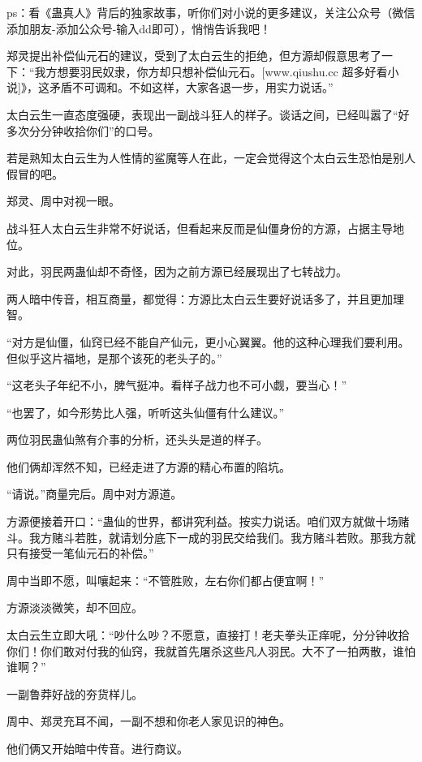 
\begin{this_body}

ps：看《蛊真人》背后的独家故事，听你们对小说的更多建议，关注公众号（微信添加朋友-添加公众号-输入dd即可），悄悄告诉我吧！

郑灵提出补偿仙元石的建议，受到了太白云生的拒绝，但方源却假意思考了一下：“我方想要羽民奴隶，你方却只想补偿仙元石。[www.qiushu.cc 超多好看小说]》，这矛盾不可调和。不如这样，大家各退一步，用实力说话。”

太白云生一直态度强硬，表现出一副战斗狂人的样子。谈话之间，已经叫嚣了“好多次分分钟收拾你们”的口号。

若是熟知太白云生为人性情的鲨魔等人在此，一定会觉得这个太白云生恐怕是别人假冒的吧。

郑灵、周中对视一眼。

战斗狂人太白云生非常不好说话，但看起来反而是仙僵身份的方源，占据主导地位。

对此，羽民两蛊仙却不奇怪，因为之前方源已经展现出了七转战力。

两人暗中传音，相互商量，都觉得：方源比太白云生要好说话多了，并且更加理智。

“对方是仙僵，仙窍已经不能自产仙元，更小心翼翼。他的这种心理我们要利用。但似乎这片福地，是那个该死的老头子的。”

“这老头子年纪不小，脾气挺冲。看样子战力也不可小觑，要当心！”

“也罢了，如今形势比人强，听听这头仙僵有什么建议。”

两位羽民蛊仙煞有介事的分析，还头头是道的样子。

他们俩却浑然不知，已经走进了方源的精心布置的陷坑。

“请说。”商量完后。周中对方源道。

方源便接着开口：“蛊仙的世界，都讲究利益。按实力说话。咱们双方就做十场赌斗。我方赌斗若胜，就请划分底下一成的羽民交给我们。我方赌斗若败。那我方就只有接受一笔仙元石的补偿。”

周中当即不愿，叫嚷起来：“不管胜败，左右你们都占便宜啊！”

方源淡淡微笑，却不回应。

太白云生立即大吼：“吵什么吵？不愿意，直接打！老夫拳头正痒呢，分分钟收拾你们！你们敢对付我的仙窍，我就首先屠杀这些凡人羽民。大不了一拍两散，谁怕谁啊？”

一副鲁莽好战的夯货样儿。

周中、郑灵充耳不闻，一副不想和你老人家见识的神色。

他们俩又开始暗中传音。进行商议。


\end{this_body}
